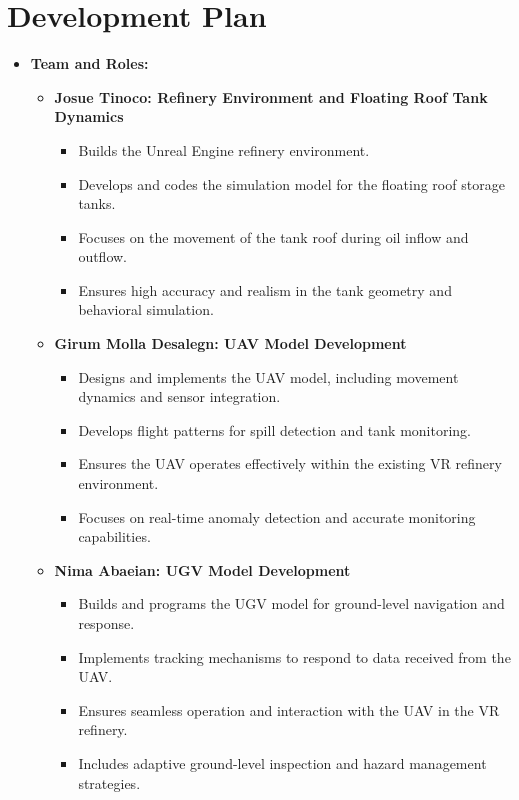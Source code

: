 \documentclass{article}
\begin{document}
\section{Development Plan}
\begin{itemize}
    \item \textbf{Team and Roles:}
    \begin{itemize}
        \item \textbf{Josue Tinoco: Refinery Environment and Floating Roof Tank Dynamics}  
        \begin{itemize}
            \item Builds the Unreal Engine refinery environment.
            \item Develops and codes the simulation model for the floating roof storage tanks.
            \item Focuses on the movement of the tank roof during oil inflow and outflow.
            \item Ensures high accuracy and realism in the tank geometry and behavioral simulation.
        \end{itemize}
        
        \item \textbf{Girum Molla Desalegn: UAV Model Development}
        \begin{itemize}
            \item Designs and implements the UAV model, including movement dynamics and sensor integration.
            \item Develops flight patterns for spill detection and tank monitoring.
            \item Ensures the UAV operates effectively within the existing VR refinery environment.
            \item Focuses on real-time anomaly detection and accurate monitoring capabilities.
        \end{itemize}
        
        \item \textbf{Nima Abaeian: UGV Model Development}
        \begin{itemize}
            \item Builds and programs the UGV model for ground-level navigation and response.
            \item Implements tracking mechanisms to respond to data received from the UAV.
            \item Ensures seamless operation and interaction with the UAV in the VR refinery.
            \item Includes adaptive ground-level inspection and hazard management strategies.
        \end{itemize}
        

\end{itemize}
\end{itemize}
\end{document}
